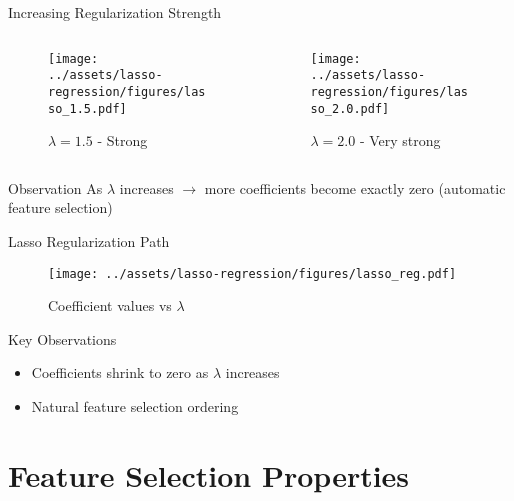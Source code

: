 \documentclass{beamer}
\begin{document}
\begin{frame}{Increasing Regularization Strength}
\begin{columns}
\begin{column}{0.5\textwidth}
\begin{figure}
\texttt{[image: ../assets/lasso-regression/figures/lasso\_1.5.pdf]}
\caption{{\footnotesize $\lambda = 1.5$ - Strong}}
\end{figure}
\end{column}
\begin{column}{0.5\textwidth}
\begin{figure}
\texttt{[image: ../assets/lasso-regression/figures/lasso\_2.0.pdf]}
\caption{{\footnotesize $\lambda = 2.0$ - Very strong}}
\end{figure}
\end{column}
\end{columns}

\begin{keypointsbox}{Observation}
As $\lambda$ increases $\rightarrow$ more coefficients become exactly zero (automatic feature selection)
\end{keypointsbox}
\end{frame}

\begin{frame}{Lasso Regularization Path}
\begin{figure}
    \centering
    \texttt{[image: ../assets/lasso-regression/figures/lasso\_reg.pdf]}
    \caption{{\footnotesize Coefficient values vs $\lambda$}}
    \label{fig:my_label}
\end{figure}

\footnotesize
\begin{keypointsbox}{Key Observations}
{\small
\begin{itemize}
\item Coefficients shrink to zero as $\lambda$ increases
\item Natural feature selection ordering
\end{itemize}
}
\end{keypointsbox}
\end{frame}

\section{Feature Selection Properties}
\end{document}
